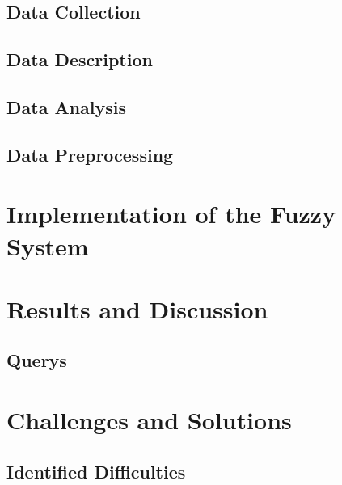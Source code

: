 \documentclass[fleqn,11pt]{article}
\begin{document}
\subsection{Data Collection}

\subsection{Data Description}

\subsection{Data Analysis}

\subsection{Data Preprocessing}

\section{Implementation of the Fuzzy System}


\section{Results and Discussion}


\subsection{Querys}

\section{Challenges and Solutions}

\subsection{Identified Difficulties}
\end{document}
